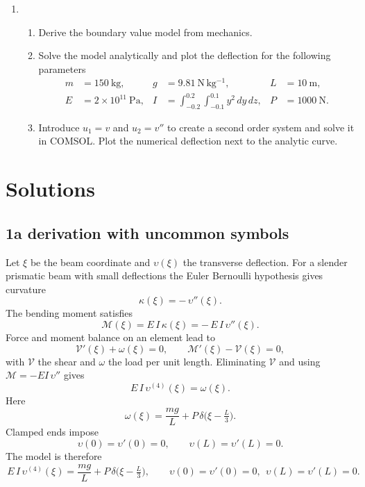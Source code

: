 \documentclass[12pt,a4paper]{article}
\begin{document}
\begin{enumerate}[leftmargin=1.2em,label=\arabic*.]
  \item
  \begin{enumerate}[label=\alph*)]
    \item Derive the boundary value model from mechanics.
    \item Solve the model analytically and plot the deflection for the following parameters
          \[
          \begin{aligned}
          m&=150~\mathrm{kg}, & g&=9.81~\mathrm{N\,kg^{-1}}, & L&=10~\mathrm{m},\\
          E&=2\times 10^{11}~\mathrm{Pa}, &
          I&=\displaystyle\int_{-0.2}^{0.2}\!\int_{-0.1}^{0.1} y^{2}\,dy\,dz, &
          P&=1000~\mathrm{N}.
          \end{aligned}
          \]
    \item Introduce $u_{1}=v$ and $u_{2}=v''$ to create a second order system and solve it in COMSOL. Plot the numerical deflection next to the analytic curve.
  \end{enumerate}
\end{enumerate}

\newpage
\section*{Solutions}

\subsection*{1a  derivation with uncommon symbols}

Let $\xi$ be the beam coordinate and $\upsilon(\xi)$ the transverse deflection.
For a slender prismatic beam with small deflections the Euler Bernoulli hypothesis gives curvature
\[
\kappa(\xi)=-\,\upsilon''(\xi).
\]
The bending moment satisfies
\[
\mathcal{M}(\xi)=E\,I\,\kappa(\xi)=-\,E\,I\,\upsilon''(\xi).
\]
Force and moment balance on an element lead to
\[
\mathcal{V}'(\xi)+\omega(\xi)=0, \qquad
\mathcal{M}'(\xi)-\mathcal{V}(\xi)=0,
\]
with $\mathcal{V}$ the shear and $\omega$ the load per unit length. Eliminating $\mathcal{V}$ and using $\mathcal{M}=-E I\,\upsilon''$ gives
\[
E\,I\,\upsilon^{(4)}(\xi)=\omega(\xi).
\]
Here
\[
\omega(\xi)=\frac{m g}{L}+P\,\delta\!\bigl(\xi-\tfrac{L}{3}\bigr).
\]
Clamped ends impose
\[
\upsilon(0)=\upsilon'(0)=0,\qquad \upsilon(L)=\upsilon'(L)=0.
\]
The model is therefore
\[
\boxed{\,E\,I\,\upsilon^{(4)}(\xi)=\frac{m g}{L}+P\,\delta\!\bigl(\xi-\tfrac{L}{3}\bigr),\qquad
\upsilon(0)=\upsilon'(0)=0,\ \ \upsilon(L)=\upsilon'(L)=0.\,}
\]
\end{document}
